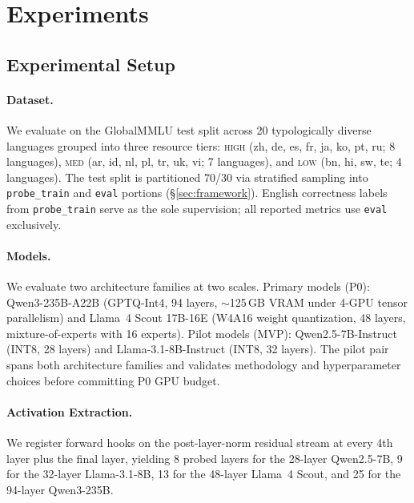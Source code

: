 \section{Experiments}
\label{sec:experiments}

\subsection{Experimental Setup}
\label{sec:setup}

\paragraph{Dataset.} We evaluate on the GlobalMMLU test split \citep{singh2024globalmmlu}
across 20 typologically diverse languages grouped into three resource tiers: \textsc{high} (zh, de, es, fr, ja, ko, pt, ru; 8 languages), \textsc{med} (ar, id, nl, pl, tr, uk, vi; 7 languages), and \textsc{low} (bn, hi, sw, te; 4 languages). The test split is partitioned 70/30 via stratified sampling into \texttt{probe\_train} and \texttt{eval} portions (\S\ref{sec:framework}). English correctness labels from \texttt{probe\_train} serve as the sole supervision; all reported metrics use \texttt{eval} exclusively.

\paragraph{Models.} We evaluate two architecture families at two scales. Primary models (P0): Qwen3-235B-A22B (GPTQ-Int4, 94 layers, ${\sim}$125\,GB VRAM under 4-GPU tensor parallelism) and Llama~4 Scout 17B-16E (W4A16 weight quantization, 48 layers, mixture-of-experts with 16 experts). Pilot models (MVP): Qwen2.5-7B-Instruct (INT8, 28 layers) and Llama-3.1-8B-Instruct (INT8, 32 layers). The pilot pair spans both architecture families and validates methodology and hyperparameter choices before committing P0 GPU budget.

\paragraph{Activation Extraction.} We register forward hooks on the post-layer-norm residual stream at every 4th layer plus the final layer, yielding 8 probed layers for the 28-layer Qwen2.5-7B, 9 for the 32-layer Llama-3.1-8B, 13 for the 48-layer Llama~4 Scout, and 25 for the 94-layer Qwen3-235B.

